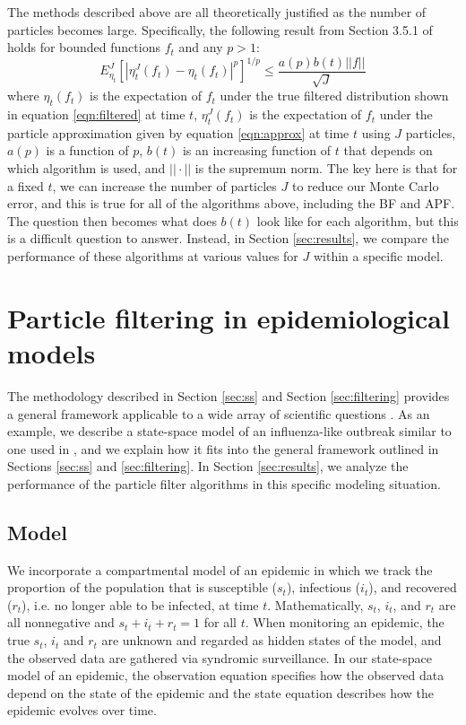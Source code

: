 \documentclass{elsarticle}
\begin{document}
The methods described above are all theoretically justified as the number of particles becomes large. Specifically, the following result from Section 3.5.1 of \cite{del2004feynman} holds for bounded functions $f_t$ and any $p>1$:
\[ E_{\eta_t}^J \left[ \left| \eta_t^J(f_t)-\eta_t(f_t)\right|^p\right]^{1/p} \le \frac{a(p) b(t) ||f||}{\sqrt{J}} \]
where $\eta_t(f_t)$ is the expectation of $f_t$ under the true filtered distribution shown in equation \eqref{eqn:filtered} at time $t$, $\eta_t^J(f_t)$ is the expectation of $f_t$ under the particle approximation given by equation \eqref{eqn:approx} at time $t$ using $J$ particles, $a(p)$ is a function of $p$, $b(t)$ is an increasing function of $t$ that depends on which algorithm is used, and $||\cdot||$ is the supremum norm. The key here is that for a fixed $t$, we can increase the number of particles $J$ to reduce our Monte Carlo error, and this is true for all of the algorithms above, including the BF and APF. The question then becomes what does $b(t)$ look like for each algorithm, but this is a difficult question to answer. Instead, in Section \ref{sec:results}, we compare the performance of these algorithms at various values for $J$ within a specific model.

\section{Particle filtering in epidemiological models \label{sec:apply}}

The methodology described in Section \ref{sec:ss} and Section \ref{sec:filtering} provides a general framework applicable to a wide array of scientific questions \citep{Carp:Clif:Fear:impr:1999, Carv:Lope:baye:2007, dukic2012tracking}. As an example, we describe a state-space model of an influenza-like outbreak similar to one used in \citet{skvortsov2012monitoring}, and we explain how it fits into the general framework outlined in Sections \ref{sec:ss} and \ref{sec:filtering}. In Section \ref{sec:results}, we analyze the performance of the particle filter algorithms in this specific modeling situation.

\subsection{Model \label{sec:model}}

We incorporate a compartmental model of an epidemic in which we track the proportion of the population that is susceptible ($s_t$), infectious ($i_t$), and recovered ($r_t$), i.e. no longer able to be infected, at time $t$. Mathematically, $s_t$, $i_t$, and $r_t$ are all nonnegative and $s_t + i_t + r_t = 1$ for all $t$. When monitoring an epidemic, the true $s_t$, $i_t$ and $r_t$ are unknown and regarded as hidden states of the model, and the observed data are gathered via syndromic surveillance. In our state-space model of an epidemic, the observation equation specifies how the observed data depend on the state of the epidemic and the state equation describes how the epidemic evolves over time.
\end{document}
